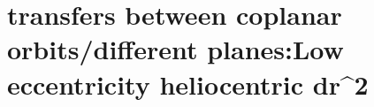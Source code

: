 \section{ transfers between coplanar orbits/different planes:Low eccentricity heliocentric dr^2  }\label{sec:q3}    
